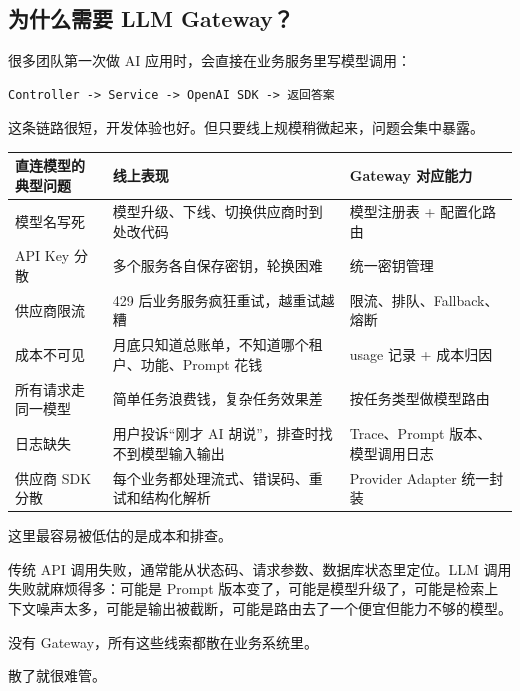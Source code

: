 \documentclass[10pt,a4paper]{ctexart}
\begin{document}
\subsection{为什么需要 LLM Gateway？}


很多团队第一次做 AI 应用时，会直接在业务服务里写模型调用：



\begin{lstlisting}
Controller -> Service -> OpenAI SDK -> 返回答案
\end{lstlisting}



这条链路很短，开发体验也好。但只要线上规模稍微起来，问题会集中暴露。


{\footnotesize
\begin{tabularx}{\textwidth}{|X|X|X|}
\hline
\textbf{直连模型的典型问题} & \textbf{线上表现} & \textbf{Gateway 对应能力} \\
\hline
模型名写死 & 模型升级、下线、切换供应商时到处改代码 & 模型注册表 + 配置化路由 \\
\hline
API Key 分散 & 多个服务各自保存密钥，轮换困难 & 统一密钥管理 \\
\hline
供应商限流 & 429 后业务服务疯狂重试，越重试越糟 & 限流、排队、Fallback、熔断 \\
\hline
成本不可见 & 月底只知道总账单，不知道哪个租户、功能、Prompt 花钱 & usage 记录 + 成本归因 \\
\hline
所有请求走同一模型 & 简单任务浪费钱，复杂任务效果差 & 按任务类型做模型路由 \\
\hline
日志缺失 & 用户投诉“刚才 AI 胡说”，排查时找不到模型输入输出 & Trace、Prompt 版本、模型调用日志 \\
\hline
供应商 SDK 分散 & 每个业务都处理流式、错误码、重试和结构化解析 & Provider Adapter 统一封装 \\
\hline
\end{tabularx}
}



这里最容易被低估的是成本和排查。



传统 API 调用失败，通常能从状态码、请求参数、数据库状态里定位。LLM 调用失败就麻烦得多：可能是 Prompt 版本变了，可能是模型升级了，可能是检索上下文噪声太多，可能是输出被截断，可能是路由去了一个便宜但能力不够的模型。



没有 Gateway，所有这些线索都散在业务系统里。



散了就很难管。
\end{document}
